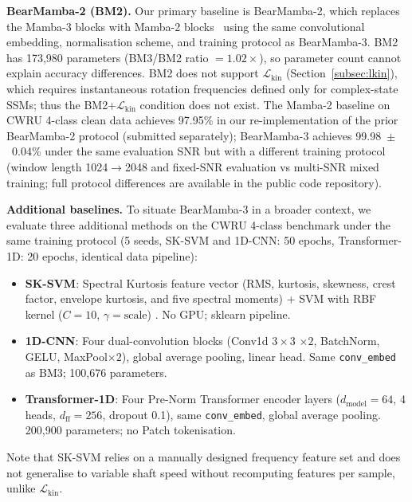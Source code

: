 \textbf{BearMamba-2 (BM2).}
Our primary baseline is BearMamba-2, which replaces the Mamba-3 blocks with
Mamba-2 blocks~\cite{mamba2} using the same convolutional embedding,
normalisation scheme, and training protocol as BearMamba-3.
BM2 has 173,980 parameters (BM3/BM2 ratio $= 1.02\times$), so parameter
count cannot explain accuracy differences.
BM2 does not support $\mathcal{L}_{\text{kin}}$ (Section~\ref{subsec:lkin}),
which requires instantaneous rotation frequencies defined only for
complex-state SSMs; thus the BM2+$\mathcal{L}_{\text{kin}}$ condition does
not exist.
The Mamba-2 baseline on CWRU 4-class clean data achieves 97.95\% in our
re-implementation of the prior BearMamba-2 protocol (submitted separately);
BearMamba-3 achieves 99.98~$\pm$~0.04\% under the same evaluation SNR
but with a different training protocol (window length 1024$\to$2048 and
fixed-SNR evaluation vs multi-SNR mixed training; full protocol differences are available in the public code repository).

\textbf{Additional baselines.}
To situate BearMamba-3 in a broader context, we evaluate three additional
methods on the CWRU 4-class benchmark under the same training protocol
(5 seeds, SK-SVM and 1D-CNN: 50 epochs, Transformer-1D: 20 epochs,
identical data pipeline):
\begin{itemize}[noitemsep]
  \item \textbf{SK-SVM}: Spectral Kurtosis feature vector (RMS, kurtosis,
        skewness, crest factor, envelope kurtosis, and five spectral
        moments) + SVM with RBF kernel ($C=10$, $\gamma=\text{scale}$)
        \cite{antoni2006spectral_kurtosis}.
        No GPU; sklearn pipeline.
  \item \textbf{1D-CNN}: Four dual-convolution blocks
        (Conv1d $3{\times}3$ $\times 2$, BatchNorm, GELU, MaxPool$\times 2$),
        global average pooling, linear head.
        Same \texttt{conv\_embed} as BM3; 100,676 parameters.
  \item \textbf{Transformer-1D}: Four Pre-Norm Transformer encoder layers
        ($d_{\text{model}}=64$, 4 heads, $d_{\text{ff}}=256$, dropout 0.1),
        same \texttt{conv\_embed}, global average pooling.
        200,900 parameters; no Patch tokenisation.
\end{itemize}
Note that SK-SVM relies on a manually designed frequency feature set and
does not generalise to variable shaft speed without recomputing features
per sample, unlike $\mathcal{L}_{\text{kin}}$.

